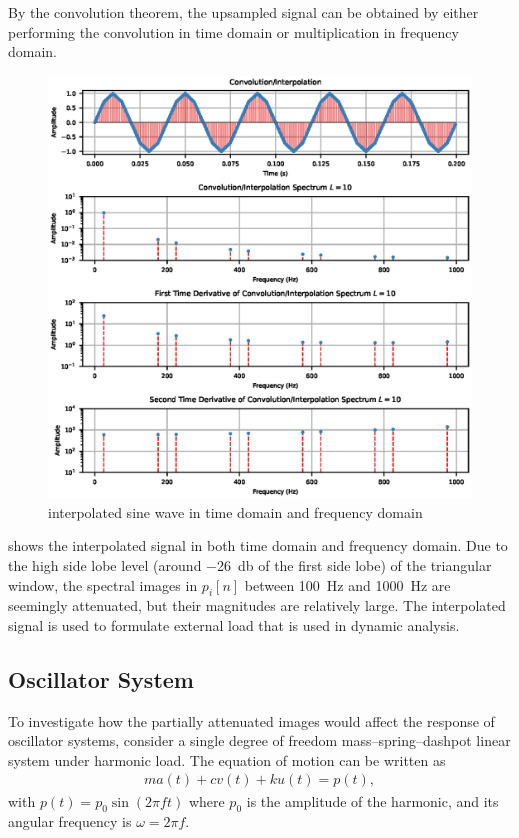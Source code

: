 By the convolution theorem, the upsampled signal can be obtained by either performing the convolution in time domain or multiplication in frequency domain.
\begin{figure}[htb!]
\centering
\includegraphics{PIC/Convolution}
\caption{interpolated sine wave in time domain and frequency domain}\label{fig:interpolated}
\end{figure}
 shows the interpolated signal in both time domain and frequency domain. Due to the high side lobe level (around \SI{-26}{\decibel} of the first side lobe) of the triangular window, the spectral images in $p_i[n]$ between \SI{100}{\hertz} and \SI{1000}{\hertz} are seemingly attenuated, but their magnitudes are relatively large. The interpolated signal is used to formulate external load that is used in dynamic analysis.
\subsection{Oscillator System}
To investigate how the partially attenuated images would affect the response of oscillator systems, consider a single degree of freedom mass--spring--dashpot linear system under harmonic load. The equation of motion can be written as
\begin{gather}
ma\left(t\right)+cv\left(t\right)+ku\left(t\right)=p\left(t\right),
\end{gather}
with $p\left(t\right)=p_0\sin\left(2\pi{}ft\right)$ where $p_0$ is the amplitude of the harmonic, and its angular frequency is $\omega=2\pi{}f$.

